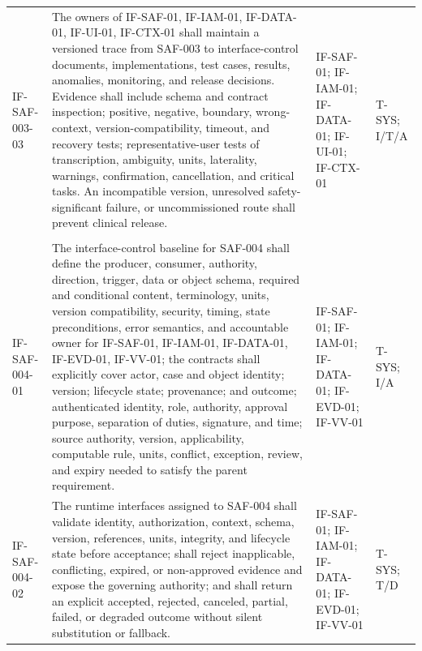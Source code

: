 \documentclass[11pt,letterpaper]{article}
\begin{document}
\begin{scriptsize}
\begin{longtable}{@{}L{0.14\textwidth}L{0.49\textwidth}L{0.19\textwidth}L{0.10\textwidth}@{}}
\addlinespace[2pt]
\mbox{IF-SAF-003-03} & The owners of IF-SAF-01, IF-IAM-01, IF-DATA-01, IF-UI-01, IF-CTX-01 shall maintain a versioned trace from SAF-003 to interface-control documents, implementations, test cases, results, anomalies, monitoring, and release decisions. Evidence shall include schema and contract inspection; positive, negative, boundary, wrong-context, version-compatibility, timeout, and recovery tests; representative-user tests of transcription, ambiguity, units, laterality, warnings, confirmation, cancellation, and critical tasks. An incompatible version, unresolved safety-significant failure, or uncommissioned route shall prevent clinical release. & IF-SAF-01; IF-IAM-01; IF-DATA-01; IF-UI-01; IF-CTX-01 & T-SYS; I\slash\allowbreak{}T\slash\allowbreak{}A \\
\addlinespace[2pt]
 \\
\addlinespace[2pt]
\mbox{IF-SAF-004-01} & The interface-control baseline for SAF-004 shall define the producer, consumer, authority, direction, trigger, data or object schema, required and conditional content, terminology, units, version compatibility, security, timing, state preconditions, error semantics, and accountable owner for IF-SAF-01, IF-IAM-01, IF-DATA-01, IF-EVD-01, IF-VV-01; the contracts shall explicitly cover actor, case and object identity; version; lifecycle state; provenance; and outcome; authenticated identity, role, authority, approval purpose, separation of duties, signature, and time; source authority, version, applicability, computable rule, units, conflict, exception, review, and expiry needed to satisfy the parent requirement. & IF-SAF-01; IF-IAM-01; IF-DATA-01; IF-EVD-01; IF-VV-01 & T-SYS; I\slash\allowbreak{}A \\
\addlinespace[2pt]
\mbox{IF-SAF-004-02} & The runtime interfaces assigned to SAF-004 shall validate identity, authorization, context, schema, version, references, units, integrity, and lifecycle state before acceptance; shall reject inapplicable, conflicting, expired, or non-approved evidence and expose the governing authority; and shall return an explicit accepted, rejected, canceled, partial, failed, or degraded outcome without silent substitution or fallback. & IF-SAF-01; IF-IAM-01; IF-DATA-01; IF-EVD-01; IF-VV-01 & T-SYS; T\slash\allowbreak{}D \\

\end{longtable}
\end{scriptsize}
\end{document}
